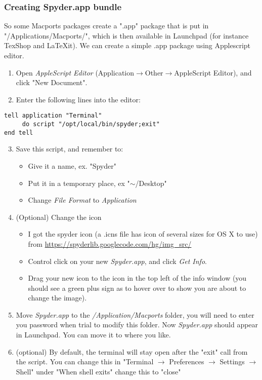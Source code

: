 \documentclass[11pt, A4paper]{article}
\begin{document}
\subsubsection{Creating Spyder.app bundle}
So some Macports packages create a ".app" package that is put in "/Applications/Macports/", which is then available in Launchpad (for instance TexShop and LaTeXit). We can create a simple .app package using Applescript editor.
\begin{enumerate}
	\item Open {\it AppleScript Editor} (Application$\rightarrow$Other$\rightarrow$AppleScript Editor), and click "New Document".
	\item Enter the following lines into the editor:
\end{enumerate}
\begin{lstlisting}[style=Bash]
tell application "Terminal"
     do script "/opt/local/bin/spyder;exit"
end tell
\end{lstlisting}
\begin{enumerate}
	\setcounter{enumi}{2}
	\item Save this script, and remember to:
	\begin{itemize} 
		\item Give it a name, ex. "Spyder"
		\item Put it in a temporary place, ex "$\sim$/Desktop"
		\item Change {\it File Format} to {\it Application}
	\end{itemize}
	\item (Optional) Change the icon
	\begin{itemize}
		\item I got the spyder icon (a {.icns} file has icon of several sizes for OS X to use) from \url{https://spyderlib.googlecode.com/hg/img_src/}
		\item Control click on your new {\it Spyder.app}, and click {\it Get Info}.
		\item Drag your new icon to the icon in the top left of the info window (you should see a green plus sign as to hover over to show you are about to change the image).
	\end{itemize}
	\item Move {\it Spyder.app} to the {\it /Application/Macports} folder, you will need to enter you password when trial to modify this folder. Now {\it Spyder.app} should appear in Launchpad. You can move it to where you like.
	\item (optional) By default, the terminal will stay open after the "exit" call from the script. You can change this in "Terminal $\rightarrow$ Preferences $\rightarrow$ Settings $\rightarrow$ Shell" under "When shell exits" change this to "close"
\end{enumerate}
\end{document}
